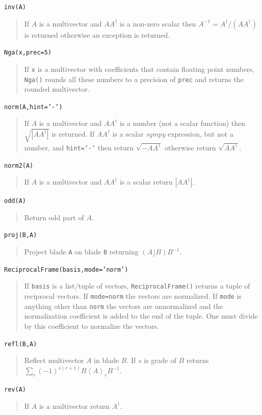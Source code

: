 \documentclass[12pt]{report}
\newcommand{\lp}{\left (}
\newcommand{\rp}{\right )}
\newcommand{\abs}[1]{\left |{#1}\right |}
\newcommand{\R}{\dagger}
\newcommand{\grade}[1]{\left < {#1} \right >}
\newcommand{\paren}[1]{\lp {#1} \rp}
\newcommand{\T}[1]{\texttt{#1}}
\begin{document}
\T{inv(A)}
\begin{quote}
   If $A$ is a multivector and $AA^{\R}$ is a non-zero scalar then $A^{-1} = A^{\R}/(AA^{\R})$ is returned
   otherwise an exception is returned.
\end{quote}

\T{Nga(x,prec=5)}
\begin{quote}
   If \T{x} is a multivector with coefficients that contain floating point numbers, \T{Nga()}
   rounds all these numbers to a precision of \T{prec} and returns the rounded multivector.
\end{quote}

\T{norm(A,hint='-')}
\begin{quote}
    If $A$ is a multivector and $AA^{\R}$ is a number (not a scalar function) then $\sqrt{\abs{AA^{\R}}}$ is returned.
    If $AA^{\R}$ is a scalar \emph{sympy} expression, but not a number, and \T{hint='-'} then return  $\sqrt{-AA^{\R}}$ otherwise return
    $\sqrt{AA^{\R}}$.
\end{quote}

\T{norm2(A)}
\begin{quote}
    If $A$ is a multivector and $AA^{\R}$ is a scalar return $\abs{AA^{\R}}$.
\end{quote}

\T{odd(A)}
\begin{quote}
    Return odd part of $A$.
\end{quote}

\T{proj(B,A)}
\begin{quote}
   Project blade \T{A} on blade \T{B} returning $\paren{A\rfloor B}B^{-1}$.
\end{quote}

\T{ReciprocalFrame(basis,mode='norm')}
\begin{quote}
   If \T{basis} is a list/tuple of vectors, \T{ReciprocalFrame()} returns a tuple of reciprocal
   vectors.  If \T{mode=norm} the vectors are normalized.  If \T{mode} is anything other than
   \T{norm} the vectors are unnormalized and the normalization coefficient is added to the
   end of the tuple.  One must divide by this coefficient to normalize the vectors.
\end{quote}

\T{refl(B,A)}
\begin{quote}
   Reflect multivector $A$ in blade $B$. If $s$ is grade of $B$
   returns $\sum_{r}(-1)^{s(r+1)}B\grade{A}_{r}B^{-1}$.
\end{quote}

\T{rev(A)}
\begin{quote}
    If $A$ is a multivector return $A^{\R}$.
\end{quote}
\end{document}
